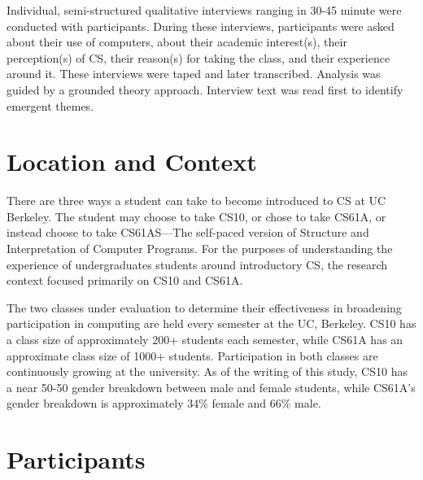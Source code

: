 \documentclass[oneside,titlepage,numbers=noenddot,headinclude,%
               footinclude=true,cleardoublepage=empty,abstractoff,BCOR=2mm,%
               paper=a4,fontsize=11pt,ngerman,american]{scrreprt}
\numberwithin{theorem}{chapter}
\numberwithin{definition}{chapter}
\numberwithin{algorithm}{chapter}
\numberwithin{figure}{chapter}
\numberwithin{table}{chapter}
\numberwithin{equation}{chapter}
\begin{document}
Individual, semi-structured qualitative interviews ranging in 30-45 minute were conducted with participants. During these interviews, participants were asked about their use of computers, about their academic interest(s), their perception(s) of CS, their reason(s) for taking the class, and their experience around it. These interviews were taped and later transcribed. Analysis was guided by a grounded theory approach. Interview text was read first to identify emergent themes.


\section *{Location and Context}
There are three ways a student can take to become introduced to CS at UC Berkeley. The student may choose to take CS10, or chose to take CS61A, or instead choose to take CS61AS---The self-paced version of Structure and Interpretation of Computer Programs. For the purposes of understanding the experience of undergraduates students around introductory CS, the research context focused primarily on CS10 and CS61A.  

The two classes under evaluation to determine their effectiveness in broadening participation in computing are held every semester at the UC, Berkeley. CS10 has a class size of approximately 200+ students each semester, while CS61A has an approximate class size of 1000+ students. Participation in both classes are continuously growing at the university. As of the writing of this study, CS10 has a near 50-50 gender breakdown between male and female students, while CS61A's gender breakdown is approximately 34\% female and 66\% male.


\section *{Participants}
\end{document}
